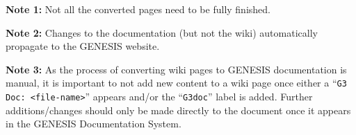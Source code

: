 \documentclass[12pt]{article}
\begin{document}
{\bf Note 1:} Not all the converted pages need to be fully finished.

{\bf Note 2:} Changes to the documentation (but not the wiki)
automatically propagate to the GENESIS website.

{\bf Note 3:} As the process of converting wiki pages to GENESIS
documentation is manual, it is important to not add new content to a
wiki page once either a ``{\tt G3 Doc: <file-name>}'' appears and/or
the ``{\tt G3doc}'' label is added. Further additions/changes should
only be made directly to the document once it appears in the GENESIS
Documentation System.
\end{document}
